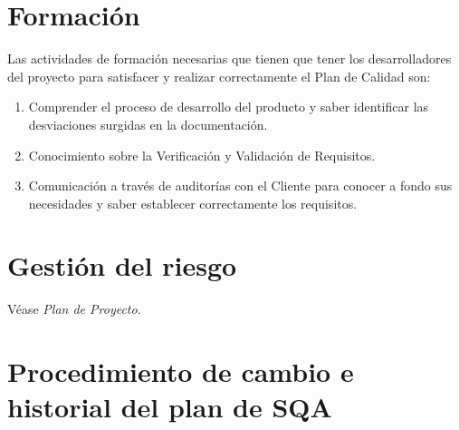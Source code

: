 \documentclass[11pt, a4paper, twoside, titlepage]{article}
\begin{document}
	\section{Formación}%
	Las actividades de formación necesarias que tienen que tener los desarrolladores del proyecto  para satisfacer
		y realizar correctamente el Plan de Calidad son:
		\begin{enumerate}
			\item Comprender el proceso de desarrollo del producto y saber identificar las desviaciones surgidas en la documentación.
			\item Conocimiento sobre la Verificación y Validación de Requisitos.
			\item Comunicación a través de auditorías con el Cliente para conocer a fondo sus necesidades y saber establecer correctamente
			los requisitos.
		\end{enumerate}
		
	\section{Gestión del riesgo}
		Véase \textit{Plan de Proyecto}.
		\printglossaries
	\section{Procedimiento de cambio e historial del plan de SQA}%


	\newpage
	
	
\end{document}
